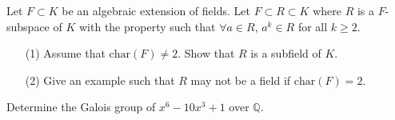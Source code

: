\documentclass[openany]{book}
\begin{document}
\begin{prob}
    Let \(F\subset K\) be an algebraic extension of fields. Let \(F\subset R\subset K\) where \(R\) is a \(F\)-subspace of \(K\) with the property such that \(\forall a\in R\), \(a^{k}\in R\) for all \(k\geq 2\).
    \begin{itemize}
        \item[(1)] Assume that \(\text{char}(F)\neq 2\). Show that \(R\) is a subfield of \(K\).
        \item[(2)] Give an example such that \(R\) may not be a field if \(\text{char}(F)=2\).
    \end{itemize}
\end{prob}

\begin{prob}
    Determine the Galois group of \(x^{6}-10x^{3}+1\) over \(\mathbb{Q}\).
\end{prob}
\end{document}
